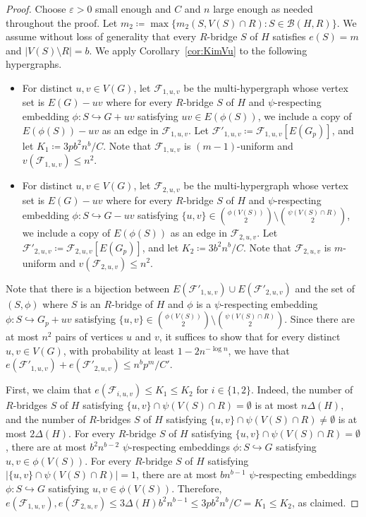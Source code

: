 \documentclass[11pt]{article}
\numberwithin{equation}{section}
\newcommand{\eps}{\varepsilon}
\newcounter{i}
\theoremstyle{plain}
\theoremstyle{plain} %
\theoremstyle{definition}
\newcommand{\cB}{\mathcal{B}}
\newcommand{\cF}{\mathcal{F}}
\begin{document}
\begin{proof}
Choose $\varepsilon > 0$ small enough and $C$ and $n$ large enough as needed throughout the proof.  Let $m_2 \coloneqq \max\{m_2(S, V(S) \cap R) : S \in \cB(H, R)\}$.
We assume without loss of generality that every $R$-bridge $S$ of $H$ satisfies $e(S) = m$ and $|V(S) \setminus R| = b$.
We apply Corollary~\ref{cor:KimVu} to the following hypergraphs.
\begin{itemize}
    \item For distinct $u,v \in V(G)$, let $\cF_{1,u,v}$ be the multi-hypergraph whose vertex set is $E(G) - uv$ where for every $R$-bridge $S$ of $H$ and $\psi$-respecting embedding $\phi : S \hookrightarrow G + uv$ satisfying $uv \in E(\phi(S))$, we include a copy of $E(\phi(S))-uv$ as an edge in $\cF_{1,u,v}$.  
    Let $\cF'_{1,u,v} \coloneqq \cF_{1,u,v}[E(G_p)]$, and let $K_1 \coloneqq 3pb^2n^{b}/C$.
    Note that $\cF_{1,u,v}$ is $(m-1)$-uniform and $v(\cF_{1,u,v}) \leq n^2$.
    \item For distinct $u,v \in V(G)$, let $\cF_{2,u,v}$ be the multi-hypergraph whose vertex set is $E(G) - uv$ where for every $R$-bridge $S$ of $H$ and $\psi$-respecting embedding $\phi : S \hookrightarrow G - uv$ satisfying  $\{u,v\} \in \binom{\phi(V(S))}{2}\setminus \binom{\psi(V(S)\cap R)}{2}$, we include a copy of $E(\phi(S))$ as an edge in $\cF_{2,u,v}$.
    Let $\cF'_{2,u,v} \coloneqq \cF_{2,u,v}[E(G_p)]$, and let $K_2 \coloneqq 3b^2n^{b} / C$.
    Note that $\cF_{2,u,v}$ is $m$-uniform and $v(\cF_{2,u,v}) \leq n^2$.
\end{itemize}
Note that there is a bijection between $E(\cF'_{1,u,v}) \cup E(\cF'_{2,u,v})$ and the set of $(S, \phi)$ where $S$ is an $R$-bridge of $H$ and $\phi$ is a $\psi$-respecting embedding $\phi : S \hookrightarrow G_p + uv$ satisfying $\{u,v\} \in \binom{\phi(V(S))}{2}\setminus \binom{\psi(V(S)\cap R)}{2}$.
Since there are at most $n^2$ pairs of vertices $u$ and $v$, it suffices to show that for every distinct $u,v \in V(G)$, with probability at least $1 - 2n^{-\log n}$, we have that $e(\cF'_{1,u,v}) + e(\cF'_{2,u,v}) \leq n^b p^m / C'$.

First, we claim that $e(\cF_{i,u,v}) \leq K_1 \leq K_2$ for $i \in \{1,2\}$.
Indeed, the number of $R$-bridges $S$ of $H$ satisfying $\{u,v\}\cap \psi(V(S)\cap R) = \emptyset$ is at most $n\Delta(H)$, and the number of $R$-bridges $S$ of $H$ satisfying $\{u,v\}\cap \psi(V(S)\cap R)\neq \emptyset$ is at most $2\Delta(H)$.  For every $R$-bridge $S$ of $H$ satisfying $\{u,v\}\cap \psi(V(S)\cap R) = \emptyset$, there are at most $b^2n^{b-2}$ 
$\psi$-respecting embeddings $\phi : S \hookrightarrow G$ satisfying $u,v \in \phi(V(S))$.
For every $R$-bridge $S$ of $H$ satisfying $|\{u,v\}\cap \psi(V(S)\cap R)| = 1$, there are at most $bn^{b-1}$ $\psi$-respecting embeddings $\phi : S \hookrightarrow G$ satisfying $u,v \in \phi(V(S))$. 
Therefore, $e(\cF_{1,u,v}), e(\cF_{2,u,v}) \leq 3\Delta(H)b^2 n^{b-1} \leq 3pb^2n^{b} / C = K_1 \leq K_2$, as claimed.


\end{proof}
\end{document}
